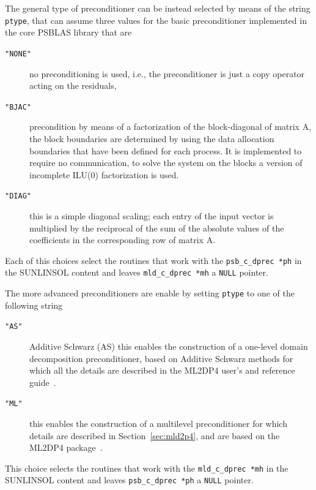\documentclass[twoside,a4paper]{refart}
\theoremstyle{definition}
\begin{document}
	The general type of preconditioner can be instead selected by means of the string \lstinline[style=CStyle]|ptype|, that can assume three values for the basic preconditioner implemented in the core PSBLAS library that are
	\begin{description}
		\item[\textcolor{mPurple}{\texttt{"NONE"}}] no preconditioning is used, i.e., the preconditioner is just a copy operator acting on the residuals,
		\item[\textcolor{mPurple}{\texttt{"BJAC"}}] precondition by means of a factorization of the block-diagonal of matrix A, the block boundaries are determined by using the data allocation boundaries that have been defined for each process. It is implemented to require no communication, to solve the system on the blocks a version of incomplete ILU(0) factorization is used.
		\item[\textcolor{mPurple}{\texttt{"DIAG"}}] this is a simple diagonal scaling; each entry of the input vector is multiplied by the reciprocal of the sum of the absolute values of the coefficients in the corresponding row of matrix A.
	\end{description}
	Each of this choices select the routines that work with the \lstinline[style=CStyle]|psb_c_dprec *ph| in the SUNLINSOL content and leaves \lstinline[style=CStyle]|mld_c_dprec *mh| a \lstinline[style=CStyle]|NULL| pointer.

	The more advanced preconditioners are enable by setting \lstinline[style=CStyle]|ptype| to one of the following string
	\begin{description}
		\item[\textcolor{mPurple}{\texttt{"AS"}}] Additive Schwarz (AS) this enables the construction of a one-level domain decomposition preconditioner, based on Additive Schwarz methods for which all the details are described in the ML2DP4 user's and reference guide~\cite{mld2p4guide}.
		\item[\textcolor{mPurple}{\texttt{"ML"}}] this enables the construction of a multilevel preconditioner for which details are described in Section~\ref{sec:mld2p4}, and are based on the ML2DP4 package~\cite{MR2738234,mld2p4guide}.
	\end{description}
	This choice selects the routines that work with the \lstinline[style=CStyle]|mld_c_dprec *mh| in the SUNLINSOL content and leaves \lstinline[style=CStyle]|psb_c_dprec *ph| a \lstinline[style=CStyle]|NULL| pointer.
\end{document}

